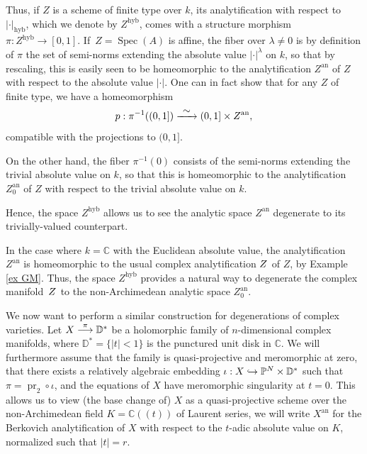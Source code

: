 \documentclass[JEP,XML,SOM,Unicode,published]{cedram}
\newcommand{\NoChangel}[1]{%
\expandafter\let\csname old\string#1\endcsname=#1
\let#1=\relax
\newcommand{#1}{\mathcode`l="716C\csname old\string#1\endcsname\mathcode`l="7160 }%
}
\newcommand\hto{\mathrel{\lhook\joinrel\to}}
\newcommand{\To}[1]{\mathchoice{\xrightarrow{\textstyle\kern4pt#1\kern3pt}}{\stackrel{#1}{\longrightarrow}}{}{}}
\newcommand{\lpr}{(\!(}
\newcommand{\rpr}{)\!)}
\theoremstyle{definition}
\newcommand \C{\mathbb C}
\newcommand \D {\mathbb{D}}
\newcommand \CP {\mathbb P}
\newcommand{\an}{\mathrm{an}}
\newcommand{\hol}{\mathrm{hol}}\NoChangel{\hol}
\newcommand{\hyb}{\mathrm{hyb}}
\DeclareMathOperator{\pr}{pr}
\DeclareMathOperator{\Sp}{Spec}
\begin{document}
Thus, if $Z$ is a scheme of finite type over $k$, its analytification with respect to $\lvert \cdot \rvert_{\hyb}$, which we denote by $Z^{\hyb}$, comes with a structure morphism $\pi: Z^{\hyb} \to [0,1]$. If~$Z = \Sp(A)$ is affine, the fiber over $\lambda \neq 0$ is by definition of $\pi$ the set of semi-norms extending the absolute value $\lvert \cdot \rvert^{\lambda}$ on $k$, so that by rescaling, this is easily seen to be homeomorphic to the analytification $Z^{\an}$ of $Z$ with respect to the absolute value $\lvert \cdot \rvert$. One can in fact show that for any $Z$ of finite type, we have a homeomorphism
\[
p: \pi^{-1}((0,1]) \To{\sim} (0,1] \times Z^{\an},
\]
compatible with the projections to $(0, 1]$.

On the other hand, the fiber $\pi^{-1}(0)$ consists of the semi-norms extending the trivial absolute value on $k$, so that this is homeomorphic to the analytification $Z^{\an}_0$ of $Z$ with respect to the trivial absolute value on $k$.

Hence, the space $Z^{\hyb}$ allows us to see the analytic space $Z^{\an}$ degenerate to its trivially-valued counterpart.

In the case where $k = \C$ with the Euclidean absolute value, the analytification~$Z^{\an}$ is homeomorphic to the usual complex analytification $Z^{\hol}$ of $Z$, by Example \ref{ex GM}. Thus, the space $Z^{\hyb} $ provides a natural way to degenerate the complex manifold~$Z^{\hol}$ to the non-Archimedean analytic space $Z^{\an}_0$.

We now want to perform a similar construction for degenerations of complex varieties. Let $X \To{\pi} \D^*$ be a holomorphic family of $n$-dimensional complex manifolds, where $\D^* =\{ \lvert t \rvert <1 \}$ is the punctured unit disk in $\C$. We will furthermore assume that the family is quasi-projective and meromorphic at zero, \ie that there exists a relatively algebraic embedding $\iota: X \hto \CP^{N} \times \D^*$ such that $\pi =\pr_2 \circ \iota$, and the equations of $X$ have meromorphic singularity at $t=0$. This allows us to view (the base change of) $X$ as a quasi-projective scheme over the non-Archimedean field $K = \C\lpr t\rpr$ of Laurent series, we will write $X^{\an}$ for the Berkovich analytification of $X$ with respect to the $t$-adic absolute value on $K$, normalized such that $\lvert t \rvert =r$.
\end{document}
